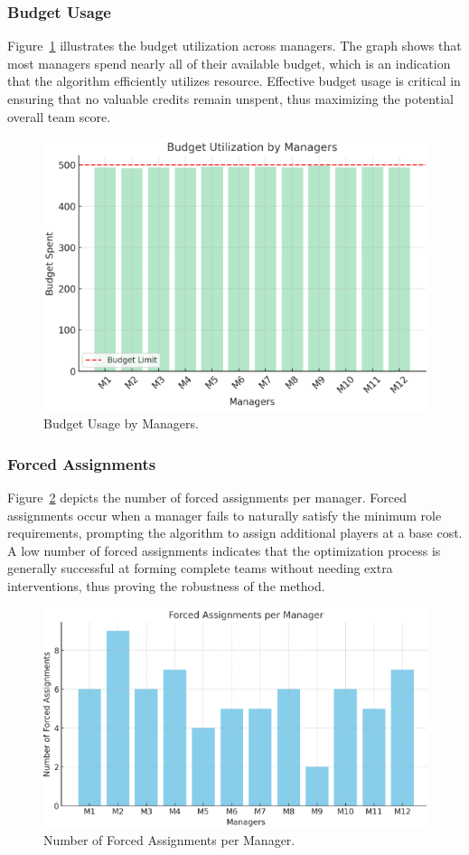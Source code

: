 \documentclass[sigconf]{acmart}
\begin{document}
\subsubsection{Budget Usage}
Figure~\ref{fig:budget_usage} illustrates the budget utilization across managers. The graph shows that most managers spend nearly all of their available budget, which is an indication that the algorithm efficiently utilizes resource. Effective budget usage is critical in ensuring that no valuable credits remain unspent, thus maximizing the potential overall team score.

\begin{figure}[H]
	\centering
	\includegraphics[width=0.8\linewidth]{plot/budget_usage.png}
	\caption{Budget Usage by Managers.}
	\label{fig:budget_usage}
\end{figure}

\subsubsection{Forced Assignments}
Figure~\ref{fig:forced_assignments} depicts the number of forced assignments per manager. Forced assignments occur when a manager fails to naturally satisfy the minimum role requirements, prompting the algorithm to assign additional players at a base cost. A low number of forced assignments indicates that the optimization process is generally successful at forming complete teams without needing extra interventions, thus proving the robustness of the method.

\begin{figure}[H]
	\centering
	\includegraphics[width=0.8\linewidth]{plot/forced_assignments.png}
	\caption{Number of Forced Assignments per Manager.}
	\label{fig:forced_assignments}
\end{figure}
\end{document}
